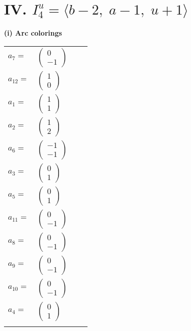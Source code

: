 \documentclass[1p]{elsarticle_modified}
\theoremstyle{definition}
\begin{document}
\centering \section*{IV. $I^u_{4}= \langle b-2,\;a-1,\;u+1 \rangle$}
\flushleft \textbf{(i) Arc colorings}\\
\begin{tabular}{m{7pt} m{180pt} m{7pt} m{180pt} }
\flushright $a_{7}=$&$\begin{pmatrix}0\\-1\end{pmatrix}$ \\
\flushright $a_{12}=$&$\begin{pmatrix}1\\0\end{pmatrix}$ \\
\flushright $a_{1}=$&$\begin{pmatrix}1\\1\end{pmatrix}$ \\
\flushright $a_{2}=$&$\begin{pmatrix}1\\2\end{pmatrix}$ \\
\flushright $a_{6}=$&$\begin{pmatrix}-1\\-1\end{pmatrix}$ \\
\flushright $a_{3}=$&$\begin{pmatrix}0\\1\end{pmatrix}$ \\
\flushright $a_{5}=$&$\begin{pmatrix}0\\1\end{pmatrix}$ \\
\flushright $a_{11}=$&$\begin{pmatrix}0\\-1\end{pmatrix}$ \\
\flushright $a_{8}=$&$\begin{pmatrix}0\\-1\end{pmatrix}$ \\
\flushright $a_{9}=$&$\begin{pmatrix}0\\-1\end{pmatrix}$ \\
\flushright $a_{10}=$&$\begin{pmatrix}0\\-1\end{pmatrix}$ \\
\flushright $a_{4}=$&$\begin{pmatrix}0\\1\end{pmatrix}$\\&\end{tabular}
\end{document}
